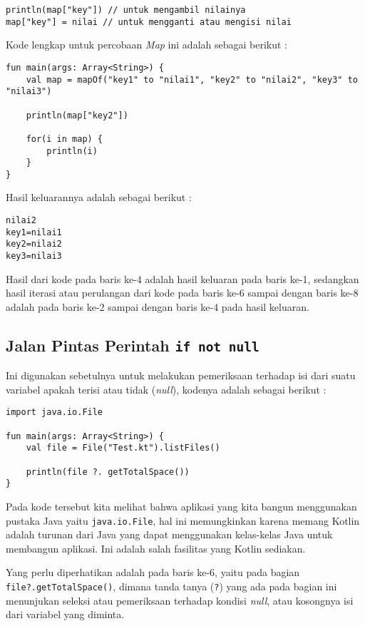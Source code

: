 \begin{lstlisting}
println(map["key"]) // untuk mengambil nilainya
map["key"] = nilai // untuk mengganti atau mengisi nilai
\end{lstlisting}

Kode lengkap untuk percobaan \textit{Map} ini adalah sebagai berikut :

\begin{lstlisting}
fun main(args: Array<String>) {
	val map = mapOf("key1" to "nilai1", "key2" to "nilai2", "key3" to "nilai3")
	
	println(map["key2"])
	
	for(i in map) {
		println(i)
	}
}
\end{lstlisting}

Hasil keluarannya adalah sebagai berikut :

\begin{lstlisting}
nilai2
key1=nilai1
key2=nilai2
key3=nilai3
\end{lstlisting}

Hasil dari kode pada baris ke-4 adalah hasil keluaran pada baris ke-1, sedangkan hasil iterasi atau perulangan dari kode pada baris ke-6 sampai dengan baris ke-8 adalah pada baris ke-2 sampai dengan baris ke-4 pada hasil keluaran.

\subsection{Jalan Pintas Perintah \texttt{if not null}}

Ini digunakan sebetulnya untuk melakukan pemeriksaan terhadap isi dari suatu variabel apakah terisi atau tidak (\textit{null}), kodenya adalah sebagai berikut :

\begin{lstlisting}
import java.io.File

fun main(args: Array<String>) {
	val file = File("Test.kt").listFiles()
	
	println(file ?. getTotalSpace())
}
\end{lstlisting}

Pada kode tersebut kita melihat bahwa aplikasi yang kita bangun menggunakan pustaka Java yaitu \texttt{java.io.File}, hal ini memungkinkan karena memang Kotlin adalah turunan dari Java yang dapat menggunakan kelas-kelas Java untuk membangun aplikasi. Ini adalah salah fasilitas yang Kotlin sediakan.

Yang perlu diperhatikan adalah pada baris ke-6, yaitu pada bagian \texttt{file?.getTotalSpace()}, dimana tanda tanya (\texttt{?}) yang ada pada bagian ini menunjukan seleksi atau pemeriksaan terhadap kondisi \textit{null}, atau kosongnya isi dari variabel yang diminta.

